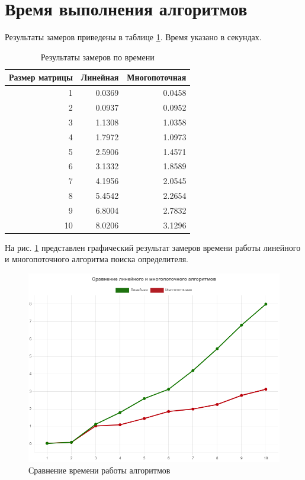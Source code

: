 \clearpage
\section{Время выполнения алгоритмов}
\hspace{\parindent}Результаты замеров приведены в таблице \ref{tbl:time}. Время указано в секундах.

\begin{table}[H]
	\begin{center}
		\centering
		\captionsetup{skip=0pt,justification=raggedright,singlelinecheck=off}
		\caption{Результаты замеров по времени}
		\label{tbl:time}
		\begin{tabular}{|r|r|r|}
			\hline
			Размер матрицы & Линейная & Многопоточная\\
			\hline
			1 & 0.0369 & 0.0458 \\
			\hline
			2 & 0.0937 & 0.0952 \\
			\hline
			3 & 1.1308 & 1.0358 \\
			\hline
			4 & 1.7972 & 1.0973 \\
			\hline
			5 & 2.5906 & 1.4571 \\
			\hline
			6 & 3.1332 & 1.8589 \\
			\hline
			7 & 4.1956 & 2.0545 \\
			\hline
			8 & 5.4542 & 2.2654 \\
			\hline
			9 & 6.8004 & 2.7832 \\
			\hline
			10 & 8.0206 & 3.1296 \\
			\hline
		\end{tabular}
	\end{center}
\end{table}

На рис. \ref{fig:measure} представлен графический результат замеров времени работы линейного и многопоточного алгоритма поиска определителя. 

\begin{figure}[h]
	\centering
	\includegraphics[height=0.4\textheight]{img/measure.png}
	\caption{Сравнение времени работы алгоритмов}
	\label{fig:measure}
\end{figure}